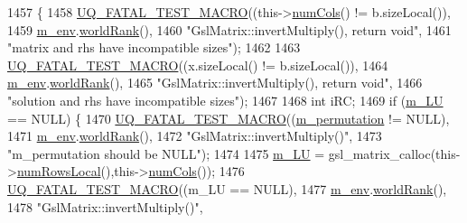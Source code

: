 \begin{DoxyCode}
1457 \{
1458   \hyperlink{_defines_8h_a56d63d18d0a6d45757de47fcc06f574d}{UQ\_FATAL\_TEST\_MACRO}((this->\hyperlink{class_q_u_e_s_o_1_1_gsl_matrix_ad5005f168fe030468e834776afb1859b}{numCols}() != b.sizeLocal()),
1459                       \hyperlink{class_q_u_e_s_o_1_1_matrix_a247fb0fc0b87fecdee054bb4660b68e8}{m\_env}.\hyperlink{class_q_u_e_s_o_1_1_base_environment_a78b57112bbd0e6dd0e8afec00b40ffa7}{worldRank}(),
1460                       \textcolor{stringliteral}{"GslMatrix::invertMultiply(), return void"},
1461                       \textcolor{stringliteral}{"matrix and rhs have incompatible sizes"});
1462 
1463   \hyperlink{_defines_8h_a56d63d18d0a6d45757de47fcc06f574d}{UQ\_FATAL\_TEST\_MACRO}((x.sizeLocal() != b.sizeLocal()),
1464                       \hyperlink{class_q_u_e_s_o_1_1_matrix_a247fb0fc0b87fecdee054bb4660b68e8}{m\_env}.\hyperlink{class_q_u_e_s_o_1_1_base_environment_a78b57112bbd0e6dd0e8afec00b40ffa7}{worldRank}(),
1465                       \textcolor{stringliteral}{"GslMatrix::invertMultiply(), return void"},
1466                       \textcolor{stringliteral}{"solution and rhs have incompatible sizes"});
1467 
1468   \textcolor{keywordtype}{int} iRC;
1469   \textcolor{keywordflow}{if} (\hyperlink{class_q_u_e_s_o_1_1_gsl_matrix_ada9c659bda4c71273af34e79eba4ec81}{m\_LU} == NULL) \{
1470     \hyperlink{_defines_8h_a56d63d18d0a6d45757de47fcc06f574d}{UQ\_FATAL\_TEST\_MACRO}((\hyperlink{class_q_u_e_s_o_1_1_gsl_matrix_a673277a250dca216e0e414110f63a9af}{m\_permutation} != NULL),
1471                         \hyperlink{class_q_u_e_s_o_1_1_matrix_a247fb0fc0b87fecdee054bb4660b68e8}{m\_env}.\hyperlink{class_q_u_e_s_o_1_1_base_environment_a78b57112bbd0e6dd0e8afec00b40ffa7}{worldRank}(),
1472                         \textcolor{stringliteral}{"GslMatrix::invertMultiply()"},
1473                         \textcolor{stringliteral}{"m\_permutation should be NULL"});
1474 
1475     \hyperlink{class_q_u_e_s_o_1_1_gsl_matrix_ada9c659bda4c71273af34e79eba4ec81}{m\_LU} = gsl\_matrix\_calloc(this->\hyperlink{class_q_u_e_s_o_1_1_gsl_matrix_ab5ec937a9fd439eef1a87e12c0dbccb4}{numRowsLocal}(),this->\hyperlink{class_q_u_e_s_o_1_1_gsl_matrix_ad5005f168fe030468e834776afb1859b}{numCols}());
1476     \hyperlink{_defines_8h_a56d63d18d0a6d45757de47fcc06f574d}{UQ\_FATAL\_TEST\_MACRO}((m\_LU == NULL),
1477                         \hyperlink{class_q_u_e_s_o_1_1_matrix_a247fb0fc0b87fecdee054bb4660b68e8}{m\_env}.\hyperlink{class_q_u_e_s_o_1_1_base_environment_a78b57112bbd0e6dd0e8afec00b40ffa7}{worldRank}(),
1478                         \textcolor{stringliteral}{"GslMatrix::invertMultiply()"},

\end{DoxyCode}
